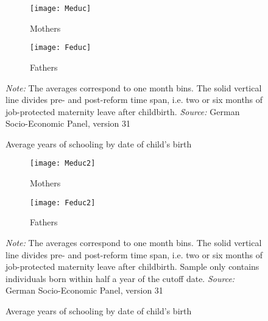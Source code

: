 \documentclass[a4paper ]{article}
\begin{document}
\clearpage






 \vspace*{\fill}
\begin{figure}[h]
	\centering
	\begin{subfigure}[t]{0.48\textwidth}
		\centering
		\texttt{[image: Meduc]}
		\caption{Mothers}		
	\end{subfigure}
	\quad
	\begin{subfigure}[t]{0.48\textwidth}
		\centering
		\texttt{[image: Feduc]}
		\caption{Fathers}
	\end{subfigure}
	\caption{Average years of schooling by date of child's birth}\label{fig:yrschooling_parents_all cohorts}
	\begin{minipage}{\textwidth} %
{\footnotesize \textit{Note:} The averages correspond to one month bins. The solid vertical line divides pre- and post-reform time span, i.e. two or six months of job-protected maternity leave after childbirth. \newline \textit{Source: }German Socio-Economic Panel, version 31\par}
\end{minipage}
\end{figure}

\begin{figure}[h]
	\centering
	\begin{subfigure}[t]{0.48\textwidth}
		\centering
		\texttt{[image: Meduc2]}
		\caption{Mothers}		
	\end{subfigure}
	\quad
	\begin{subfigure}[t]{0.48\textwidth}
		\centering
		\texttt{[image: Feduc2]}
		\caption{Fathers}
	\end{subfigure}
	\caption{Average years of schooling by date of child's birth}\label{fig:yrschooling_parents_treated cohorts}
	\begin{minipage}{\textwidth} %
{\footnotesize \textit{Note:} The averages correspond to one month bins. The solid vertical line divides pre- and post-reform time span, i.e. two or six months of job-protected maternity leave after childbirth. Sample only contains individuals born within half a year of the cutoff date. \newline \textit{Source: }German Socio-Economic Panel, version 31\par}
\end{minipage}
\end{figure}
\vspace*{\fill}
\end{document}
